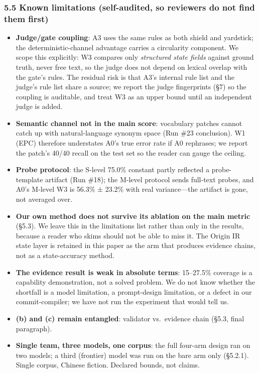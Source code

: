 \documentclass[
  english,
]{article}
\providecommand{\tightlist}{%
  \setlength{\itemsep}{0pt}\setlength{\parskip}{0pt}}
\begin{document}
\subsubsection{5.5 Known limitations (self-audited, so reviewers do not
find them
first)}\label{known-limitations-self-audited-so-reviewers-do-not-find-them-first}

\begin{itemize}
\tightlist
\item
  \textbf{Judge/gate coupling}: A3 uses the same rules as both shield
  and yardstick; the deterministic-channel advantage carries a
  circularity component. We scope this explicitly: W3 compares only
  \emph{structured state fields} against ground truth, never free text,
  so the judge does not depend on lexical overlap with the gate's rules.
  The residual risk is that A3's internal rule list and the judge's rule
  list share a source; we report the judge fingerprints (§7) so the
  coupling is auditable, and treat W3 as an upper bound until an
  independent judge is added.
\item
  \textbf{Semantic channel not in the main score}: vocabulary patches
  cannot catch up with natural-language synonym space (Run \#23
  conclusion). W1 (EPC) therefore understates A0's true error rate if A0
  rephrases; we report the patch's 40/40 recall on the test set so the
  reader can gauge the ceiling.
\item
  \textbf{Probe protocol}: the S-level 75.0\% constant partly reflected
  a probe-template artifact (Run \#18); the M-level protocol sends
  full-text probes, and A0's M-level W3 is 56.3\% ± 23.2\% with real
  variance---the artifact is gone, not averaged over.
\item
  \textbf{Our own method does not survive its ablation on the main
  metric} (§5.3). We leave this in the limitations list rather than only
  in the results, because a reader who skims should not be able to miss
  it. The Origin IR state layer is retained in this paper as the arm
  that produces evidence chains, not as a state-accuracy method.
\item
  \textbf{The evidence result is weak in absolute terms}: 15--27.5\%
  coverage is a capability demonstration, not a solved problem. We do
  not know whether the shortfall is a model limitation, a prompt-design
  limitation, or a defect in our commit-compiler; we have not run the
  experiment that would tell us.
\item
  \textbf{(b) and (c) remain entangled}: validator vs.~evidence chain
  (§5.3, final paragraph).
\item
  \textbf{Single team, three models, one corpus}: the full four-arm
  design ran on two models; a third (frontier) model was run on the bare
  arm only (§5.2.1). Single corpus, Chinese fiction. Declared bounds,
  not claims.
\end{itemize}
\end{document}

